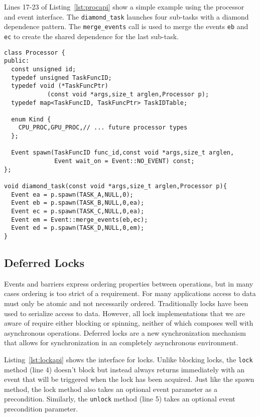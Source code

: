 Lines 17-23 of Listing~\ref{lst:procapi} show a simple example using 
the processor and event interface.  The {\tt diamond\_task} launches four
sub-tasks with a diamond dependence pattern.  The {\tt merge\_events} call
is used to merge the events {\tt eb} and {\tt ec} to create the shared dependence
for the last sub-task.

\begin{lstlisting}[float={t},label={lst:procapi},caption={Processor Interface and Example.}]
class Processor {
public:
  const unsigned id;
  typedef unsigned TaskFuncID;
  typedef void (*TaskFuncPtr)
            (const void *args,size_t arglen,Processor p);
  typedef map<TaskFuncID, TaskFuncPtr> TaskIDTable;

  enum Kind {
    CPU_PROC,GPU_PROC,// ... future processor types
  };

  Event spawn(TaskFuncID func_id,const void *args,size_t arglen,
              Event wait_on = Event::NO_EVENT) const;
};

void diamond_task(const void *args,size_t arglen,Processor p){
  Event ea = p.spawn(TASK_A,NULL,0);
  Event eb = p.spawn(TASK_B,NULL,0,ea);
  Event ec = p.spawn(TASK_C,NULL,0,ea);
  Event em = Event::merge_events(eb,ec);
  Event ed = p.spawn(TASK_D,NULL,0,em);
}
\end{lstlisting}

\subsection{Deferred Locks}
\label{subsec:locks}

Events and barriers express ordering properties between operations, but in many
cases ordering is too strict of a requirement.  For many applications access to data must only be atomic and
not necessarily ordered.  Traditionally locks have been used to serialize access to
data.  However, all lock implementations that we are aware of require either blocking
or spinning, neither of which composes well with asynchronous operations.
Deferred locks are a new synchronization mechanism that allows for synchronization
in an completely asynchronous environment.  

Listing~\ref{lst:lockapi} shows the 
interface for locks.  Unlike blocking locks, the {\tt lock} method (line 4) doesn't
block but instead always returns immediately with an event that will be triggered
when the lock has been acquired.  Just like the spawn method, the lock method also 
takes an optional event parameter as a precondition.  Similarly, the {\tt unlock} 
method (line 5) takes an optional event precondition parameter.


